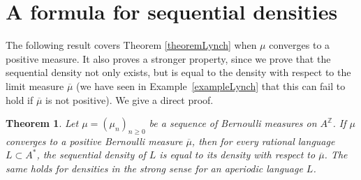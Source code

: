 \documentclass{article}[11pt]
\newtheorem{theorem}{Theorem}
\newcommand{\Z}{\mathbb{Z}}
\numberwithin{theorem}{section}
\numberwithin{equation}{section}
\numberwithin{figure}{section}
\numberwithin{table}{section}
\begin{document}
\section{A formula for sequential densities}\label{sectionDensityPositive}
The following result covers Theorem \ref{theoremLynch}
when $\mu$ converges to a positive measure.
It also proves a stronger property, since we prove that the sequential
density not only exists, but is equal to the density with respect to the limit measure $\overline{\mu}$ (we have seen in Example~\ref{exampleLynch} that this can fail
to hold if $\overline{\mu}$ is not positive). 
We give a direct proof.
\begin{theorem}\label{theoremDensityPositiveBernoulli}
Let $\mu=(\mu_n)_{n\ge 0}$ be a sequence of Bernoulli measures on $A^\Z$. If $\mu$ converges
to a positive Bernoulli measure $\overline{\mu}$, then for every rational language $L\subset A^*$, the sequential
density of $L$ is equal to its density with respect to $\overline{\mu}$.
The same holds for densities in the strong sense for an aperiodic language $L$.
\end{theorem}
\end{document}
